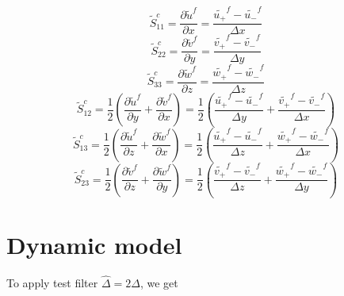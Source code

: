 \documentclass[12pt,titlepage]{article}
\begin{document}
\begin{displaymath}
\tilde{S}_{11}^c=\frac{\partial \tilde{u}^f}{\partial x}=\frac{\tilde{u_+}^f-\tilde{u_-}^f}{\Delta x}
\end{displaymath}
\begin{displaymath}
\tilde{S}_{22}^c=\frac{\partial \tilde{v}^f}{\partial y}=\frac{\tilde{v_+}^f-\tilde{v_-}^f}{\Delta y}
\end{displaymath}
\begin{displaymath}
\tilde{S}_{33}^c=\frac{\partial \tilde{w}^f}{\partial z}=\frac{\tilde{w_+}^f-\tilde{w_-}^f}{\Delta z}
\end{displaymath}
\begin{displaymath}
\tilde{S}_{12}^c=\frac{1}{2} (\frac{\partial \tilde{u}^f}{\partial y}+\frac{\partial \tilde{v}^f}{\partial x})
                =\frac{1}{2} (\frac{\tilde{u_+}^f-\tilde{u_-}^f}{\Delta y}
		 +\frac{\tilde{v_+}^f-\tilde{v_-}^f}{\Delta  x})
\end{displaymath}
\begin{displaymath}
\tilde{S}_{13}^c=\frac{1}{2} (\frac{\partial \tilde{u}^f}{\partial z}+\frac{\partial \tilde{w}^f}{\partial x})
                =\frac{1}{2} (\frac{\tilde{u_+}^f-\tilde{u_-}^f}{\Delta z}
		 +\frac{\tilde{w_+}^f-\tilde{w_-}^f}{\Delta  x})
\end{displaymath}
\begin{displaymath}
\tilde{S}_{23}^c=\frac{1}{2} (\frac{\partial \tilde{v}^f}{\partial z}+\frac{\partial \tilde{w}^f}{\partial y})
                =\frac{1}{2} (\frac{\tilde{v_+}^f-\tilde{v_-}^f}{\Delta z}
		 +\frac{\tilde{w_+}^f-\tilde{w_-}^f}{\Delta  y})
\end{displaymath}



\section{Dynamic model}

To apply test filter $\hat{\Delta}=2\Delta$, we get
\end{document}
